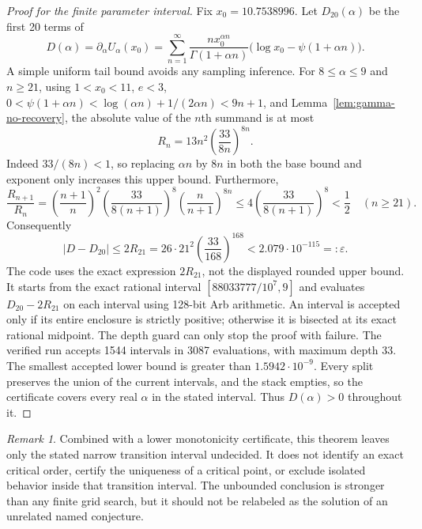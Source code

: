 \documentclass[11pt,a4paper]{article}
\theoremstyle{plain}
\theoremstyle{remark}
\newtheorem*{remark}{Remark}
\begin{document}
\begin{proof}[Proof for the finite parameter interval]
Fix $x_0=10.7538996$. Let $D_{20}(\alpha)$ be the first 20 terms of
\[
 D(\alpha)=\partial_\alpha U_\alpha(x_0)
 =\sum_{n=1}^\infty
 \frac{n x_0^{\alpha n}}{\Gamma(1+\alpha n)}
       \bigl(\log x_0-\psi(1+\alpha n)\bigr).
\]
A simple uniform tail bound avoids any sampling inference. For
$8\le\alpha\le9$ and $n\ge21$, using $1<x_0<11$, $e<3$,
$0<\psi(1+\alpha n)<\log(\alpha n)+1/(2\alpha n)<9n+1$, and
Lemma~\ref{lem:gamma-no-recovery}, the absolute value of the $n$th
summand is at most
\[
 R_n=13n^2\left(\frac{33}{8n}\right)^{8n}.
\]
Indeed $33/(8n)<1$, so replacing $\alpha n$ by $8n$ in both the
base bound and exponent only increases this upper bound. Furthermore,
\[
 \frac{R_{n+1}}{R_n}
 =\left(\frac{n+1}{n}\right)^2
  \left(\frac{33}{8(n+1)}\right)^8
  \left(\frac n{n+1}\right)^{8n}
 \le4\left(\frac{33}{8(n+1)}\right)^8<\frac12
 \quad(n\ge21).
\]
Consequently
\[
 |D-D_{20}|\le2R_{21}
 =26\cdot21^2\left(\frac{33}{168}\right)^{168}
 <2.079\cdot10^{-115}=:\varepsilon.
\]
The code uses the exact expression $2R_{21}$, not the displayed rounded
upper bound. It starts from the exact rational interval
$[88033777/10^7,9]$ and evaluates $D_{20}-2R_{21}$ on each interval
using 128-bit Arb arithmetic. An interval is accepted only if its entire
enclosure is strictly positive; otherwise it is bisected at its exact
rational midpoint. The depth guard can only stop the proof with failure.
The verified run accepts 1544 intervals in 3087 evaluations, with maximum
depth 33. The smallest accepted lower bound is greater than
$1.5942\cdot10^{-9}$. Every split preserves the union of the current
intervals, and the stack empties, so the certificate covers every real
$\alpha$ in the stated interval. Thus $D(\alpha)>0$ throughout it.
\end{proof}

\begin{remark}
Combined with a lower monotonicity certificate, this theorem leaves only
the stated narrow transition interval undecided. It does not identify an
exact critical order, certify the uniqueness of a critical point, or
exclude isolated behavior inside that transition interval. The
unbounded conclusion is stronger than any finite grid search, but it
should not be relabeled as the solution of an unrelated named conjecture.
\end{remark}
\end{document}
